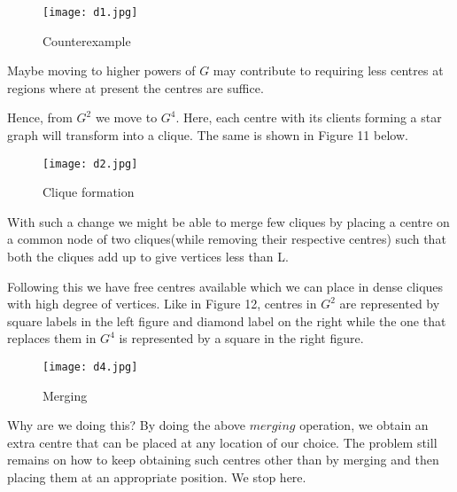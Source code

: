 \documentclass[12pt,a4paper,onecolumn]{article}
\begin{document}
\begin{figure}[H]
\begin{center}
\texttt{[image: d1.jpg]}
  \caption{Counterexample}
  \label{Figure 12}
\end{center}
\end{figure} Maybe moving to higher powers of $G$ may contribute to requiring less centres at regions where at present the centres are suffice.

Hence, from $G^2$ we move to $G^4$. Here, each centre with its clients forming a star graph will transform into a clique. The same is shown in Figure 11 below.\begin{figure}[H]
\begin{center}
\texttt{[image: d2.jpg]}
  \caption{Clique formation}
  \label{Figure 10}
\end{center}
\end{figure} With such a change we might be able to merge few cliques by placing a centre on a common node of two cliques(while removing their respective centres) such that both the cliques add up to give vertices less than L. 

Following this we have free centres available which we can place in dense cliques with high degree of vertices. Like in Figure 12, centres in $G^2$ are represented by square labels in the left figure and diamond label on the right while the one that replaces them in $G^4$ is represented by a square in the right figure.
\begin{figure}[H]
\begin{center}
\texttt{[image: d4.jpg]}
  \caption{Merging}
  \label{Figure 11}
\end{center}
\end{figure}
Why are we doing this? By doing the above $merging$ operation, we obtain an extra centre that can be placed at any location of our choice. The problem still remains on how to keep obtaining such centres other than by merging and then placing them at an appropriate position. We stop here.
\end{document}
